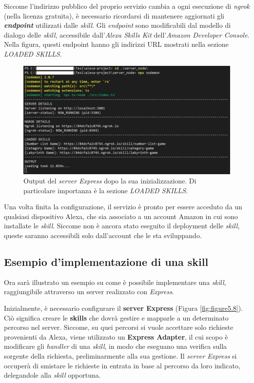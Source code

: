 Siccome l’indirizzo pubblico del proprio servizio cambia a ogni esecuzione di
\textit{ngrok} (nella licenza gratuita), è necessario ricordarsi di mantenere
aggiornati gli \textit{\textbf{endpoint}} utilizzati dalle \textit{skill}. Gli
\textit{endpoint} sono modificabili dal modello di dialogo delle
\textit{skill}, accessibile dall’\textit{Alexa Skills Kit} dell’\textit{Amazon
Developer Console}. Nella figura, questi endpoint hanno gli indirizzi URL
mostrati nella sezione \textit{LOADED SKILLS}.

\begin{figure}[!ht]
  \centering
  \includegraphics[scale=0.5]{resources/images/implementation/code/express-server-starting-capture.jpg}
  \caption{
    Output del \textit{server Express} dopo la sua inizializzazione. Di
    particolare importanza è la sezione \textit{LOADED SKILLS}.
  }
  \label{fig:figure5.7}
\end{figure}

Una volta finita la configurazione, il servizio è pronto per essere acceduto da
un qualsiasi dispositivo Alexa, che sia associato a un account Amazon in cui
sono installate le \textit{skill}. Siccome non è ancora stato eseguito il
deployment delle \textit{skill}, queste saranno accessibili solo dall’account
che le sta sviluppando.

\subsection{Esempio d'implementazione di una skill}
\label{subsec:Sezione5.2.3}

Ora sarà illustrato un esempio su come è possibile implementare una
\textit{skill}, raggiungibile attraverso un server realizzato con
\textit{Express}.

Inizialmente, è necessario configurare il \textbf{server Express} (Figura
\ref{fig:figure5.8}). Ciò significa creare le \textbf{skills} che dovrà gestire
e mapparle a un determinato percorso nel server. Siccome, su quei percorsi si
vuole accettare solo richieste provenienti da Alexa, viene utilizzato un
\textbf{Express Adapter}, il cui scopo è modificare gli \textit{handler} di una
\textit{skill}, in modo che eseguano una verifica sulla sorgente della
richiesta, preliminarmente alla sua gestione. Il \textit{server Express} si
occuperà di smistare le richieste in entrata in base al percorso da loro
indicato, delegandole alla \textit{skill} opportuna.

